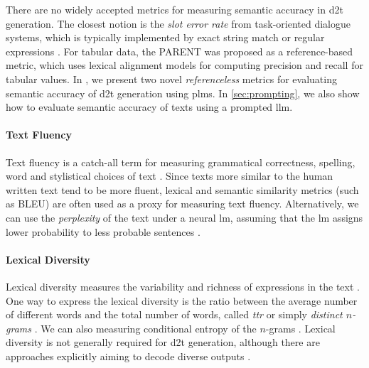 There are no widely accepted metrics for measuring semantic accuracy in \ac{d2t} generation. The closest notion is the \emph{slot error rate} from task-oriented dialogue systems, which is typically implemented by exact string match or regular expressions  \cite{wen2015semantically,dusekEvaluatingStateoftheartEndtoEnd2020}. For tabular data, the PARENT \cite{dhingraHandlingDivergentReference2019} was proposed as a reference-based metric, which uses lexical alignment models for computing precision and recall for tabular values.  In , we present two novel \emph{referenceless} metrics for evaluating semantic accuracy of \ac{d2t} generation using \acp{plm}. In \autoref{sec:prompting}, we also show how to evaluate semantic accuracy of texts using a prompted \ac{llm}.

\paragraph{Text Fluency} Text fluency is a catch-all term for measuring grammatical correctness, spelling, word and stylistical choices of text \cite{celikyilmazEvaluationTextGeneration2021}. Since texts more similar to the human written text tend to be more fluent, lexical and semantic similarity metrics (such as BLEU) are often used as a proxy for measuring text fluency. Alternatively, we can use the \emph{perplexity} of the text under a neural \ac{lm}, assuming that the \ac{lm} assigns lower probability to less probable sentences \cite{leeFactualityEnhancedLanguage2022,kaneNUBIANeUralBased2020}.


\paragraph{Lexical Diversity} Lexical diversity measures the variability and richness of expressions in the text \cite{vanmiltenburgMeasuringDiversityAutomatic2018}. One way to express the lexical diversity is the ratio between the average number of different words and the total number of words, called \emph{\ac{ttr}} or simply \emph{distinct $n$-grams} \cite{johnson1944studies,li2016diversity}. We can also measuring conditional entropy of the $n$-grams \cite{shannon1948mathematical}.
Lexical diversity is not generally required for \ac{d2t} generation, although there are approaches explicitly aiming to decode diverse outputs \cite{hanGeneratingDiverseDescriptions2021,perlitzDiversityEnhancedTabletoText2022}.

